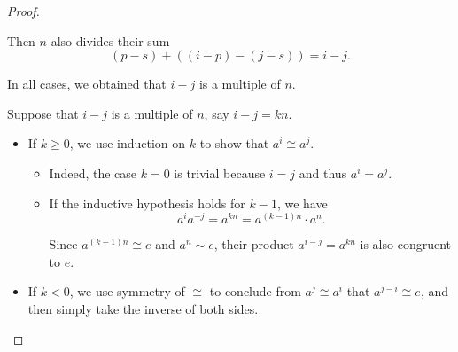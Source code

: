 \begin{proof}
\begin{itemize}
    Then \( n \) also divides their sum
    \begin{equation*}
      (p - s) + ((i - p) - (j - s)) = i - j.
    \end{equation*}
  \end{itemize}

  In all cases, we obtained that \( i - j \) is a multiple of \( n \).

  \NecessitySubProof Suppose that \( i - j \) is a multiple of \( n \), say \( i - j = kn \).

  \begin{itemize}
    \item If \( k \geq 0 \), we use induction on \( k \) to show that \( a^i \cong a^j \).
    \begin{itemize}
      \item Indeed, the case \( k = 0 \) is trivial because \( i = j \) and thus \( a^i = a^j \).
      \item If the inductive hypothesis holds for \( k - 1 \), we have
      \begin{equation*}
        a^i a^{-j} = a^{kn} = a^{(k-1)n} \cdot a^n.
      \end{equation*}

      Since \( a^{(k-1)n} \cong e \) and \( a^n \sim e \), their product \( a^{i - j} = a^{kn} \) is also congruent to \( e \).
    \end{itemize}

    \item If \( k < 0 \), we use symmetry of \( {\cong} \) to conclude from \( a^j \cong a^i \) that \( a^{j - i} \cong e \), and then simply take the inverse of both sides.
  \end{itemize}
\end{proof}

